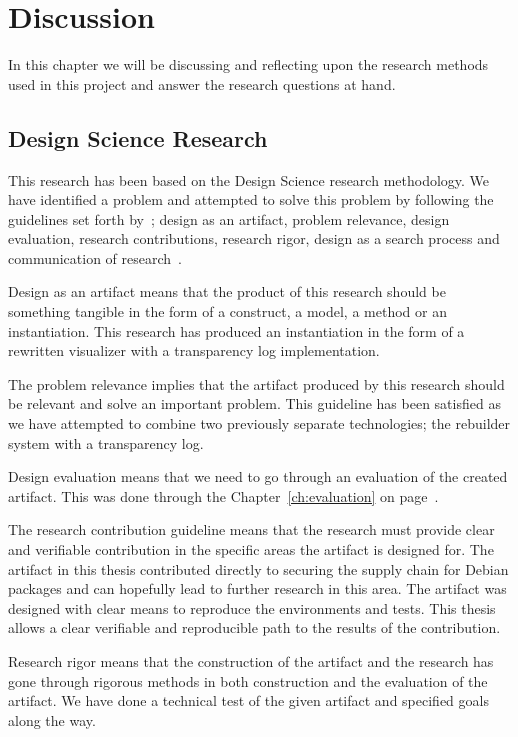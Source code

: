 \documentclass[../Main/thesis.tex]{subfiles}
\begin{document}
\chapter{Discussion}%
\label{ch:discussion}
In this chapter we will be discussing and reflecting upon the research methods
used in this project and answer the research questions at hand.

\section{Design Science Research}%
\label{sec:design_science_research_evaluation}
This research has been based on the Design Science research methodology. We have
identified a problem and attempted to solve this problem by following the
guidelines set forth
by~\citeauthor{Hevner:2004:DSI:2017212.2017217}; design as an artifact, problem
relevance, design evaluation, research contributions, research rigor, design as
a search process and communication of research~\cite{Hevner:2004:DSI:2017212.2017217}.

Design as an artifact means that the product of this research should be
something tangible in the form of a construct, a model, a method or an
instantiation. This research has produced an instantiation in the form of a
rewritten visualizer with a transparency log implementation.

The problem relevance implies that the artifact produced by this research should
be relevant and solve an important problem. This guideline has been satisfied as we
have attempted to combine two previously separate technologies; the rebuilder
system with a transparency log.

Design evaluation means that we need to go through an evaluation of the created
artifact. This was done through the Chapter~\ref{ch:evaluation}
on page~\pageref{ch:evaluation}.

The research contribution guideline means that the research must provide clear
and verifiable contribution in the specific areas the artifact is designed for.
The artifact in this thesis contributed directly to securing the supply chain
for Debian packages and can hopefully lead to further research in this area. The
artifact was designed with clear means to reproduce the environments and tests.
This thesis allows a clear verifiable and reproducible path to the results of
the contribution.

Research rigor means that the construction of the artifact and the research has
gone through rigorous methods in both construction and the evaluation of the
artifact. We have done a technical test of the given artifact and specified
goals along the way.
\end{document}
